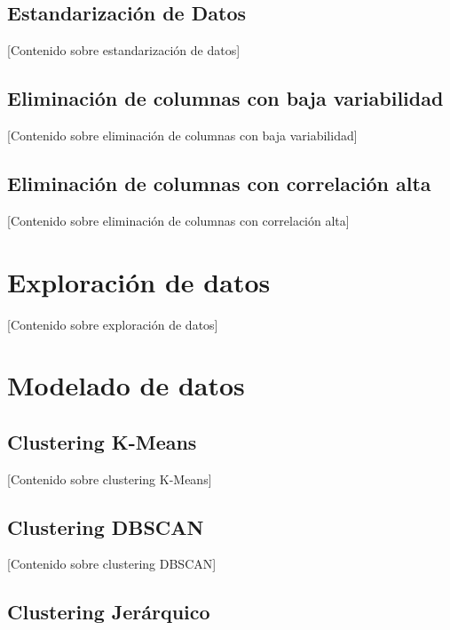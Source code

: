 \documentclass[
  12pt,
]{book}
\begin{document}
\section{Estandarización de Datos}\label{estandarizaciuxf3n-de-datos}

{[}Contenido sobre estandarización de datos{]}

\section{Eliminación de columnas con baja
variabilidad}\label{eliminaciuxf3n-de-columnas-con-baja-variabilidad}

{[}Contenido sobre eliminación de columnas con baja variabilidad{]}

\section{Eliminación de columnas con correlación
alta}\label{eliminaciuxf3n-de-columnas-con-correlaciuxf3n-alta}

{[}Contenido sobre eliminación de columnas con correlación alta{]}

\chapter{Exploración de datos}\label{exploraciuxf3n-de-datos}

{[}Contenido sobre exploración de datos{]}

\chapter{Modelado de datos}\label{modelado-de-datos}

\section{Clustering K-Means}\label{clustering-k-means}

{[}Contenido sobre clustering K-Means{]}

\section{Clustering DBSCAN}\label{clustering-dbscan}

{[}Contenido sobre clustering DBSCAN{]}

\section{Clustering Jerárquico}\label{clustering-jeruxe1rquico}
\end{document}
